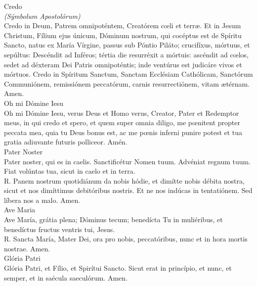 \documentclass[letterpaper, landscape, 10pt, twocolumn]{article}
\begin{document}
  \Large {\color{red} Credo}\\
  \normalsize {\color{red} \textit{ (Sýmbolum Apostolórum)}}\\
  {\color{red} C}redo in Deum, Patrem omnipoténtem, Creatórem cœli et terræ. Et in Jesum Christum, Fílium ejus únicum, Dóminum nostrum, qui cocéptus est de Spíritu Sancto, natus ex María Vírgine, passus sub Póntio Piláto; crucifíxus, mórtuus, et sepúltus: Descéndit ad Inféros; tértia die resurréxit a mórtuis: ascéndit ad cœlos, sedet ad déxteram Dei Patris omnipoténtis; inde ventúrus est judicáre vivos et mórtuos. Credo in Spíritum Sanctum, Sanctam Ecclésiam Cathólicam, Sanctórum Communiónem, remissiónem peccatórum, carnis resurrectiónem, vitam ætérnam. {\color{red} A}men.\\

  \Large {\color{red} Oh mi Dómine Iesu}\\
  \normalsize {\color{red} O}h mi Dómine Iesu, verus Deus et Homo verus, Creator, Pater et Redemptor meus, in qui credo et spero, et quem super omnia diligo, me pœnitent propter peccata mea, quia tu Deus bonus est, ac me pœnis inferni punire potest et tua gratia adiuvante futuris polliceor. {\color{red} A}mén.\\

  \Large {\color{red} Pater Noster}\\
  \normalsize {\color{red} P}ater noster, qui es in caelis. Sanctificétur Nomen tuum. Advéniat regnum tuum. Fiat volúntas tua, sicut in caelo et in terra.\\
  {\color{red} R. P}anem nostrum quotidiánum da nobis hódie, et dimítte nobis débita nostra, sicut et nos dimíttimus debitóribus nostris. Et ne nos indúcas in tentatiónem. Sed líbera nos a malo. {\color{red} A}men.\\

  \Large {\color{red} Ave Maria}\\
  \normalsize {\color{red} A}ve María, grátia plena; Dóminus tecum; benedícta Tu in muliéribus, et benedíctus fructus ventris tui, Jesus.\\
  {\color{red} R. S}ancta María, Mater Dei, ora pro nobis, peccatóribus, nunc et in hora mortis nostrae. {\color{red} A}men.\\

  \Large {\color{red} Glória Patri}\\
  \normalsize {\color{red} G}lória Patri, et Fílio, et Spirítui Sancto. Sicut erat in princípio, et nunc, et semper, et in saécula saeculórum. {\color{red} A}men.\\
\end{document}
